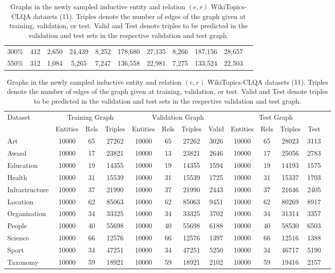 \begin{table}[!ht]
\begin{adjustbox}{width=\textwidth}
\begin{tabular}{ccccccccccc}
300\% &412  &2,650 &24,439 &8,252 &178,680 &27,135 &8,266 &187,156 &28,657 \\
550\% &312  &1,084 &5,265 &7,247 &136,558 &22,981 &7,275 &133,524 &22,503 \\
\bottomrule
\end{tabular}
\end{adjustbox}
\caption{Graphs in the newly sampled inductive entity and relation $(e,r)$ WikiTopics-CLQA datasets (11). Triples denote the number of edges of the graph given at training, validation, or test. Valid and Test denote triples to be predicted in the validation and test sets in the respective validation and test graph. 
}
\label{tab:app_datasets_indr}
\begin{adjustbox}{width=\textwidth}
\begin{tabular}{lcccccccccccc}\toprule
\multirow{2}{*}{Dataset} &\multicolumn{3}{c}{Training Graph} &\multicolumn{4}{c}{Validation Graph} &\multicolumn{4}{c}{Test Graph} \\ \cmidrule(l){2-4} \cmidrule(l){5-8} \cmidrule(l){9-12}
&Entities &Rels &Triples &Entities &Rels &Triples &Valid &Entities &Rels &Triples &Test \\\midrule
Art &10000 &65 &27262 &10000 &65 &27262 &3026 &10000 &65 &28023 &3113 \\
Award &10000 &17 &23821 &10000 &13 &23821 &2646 &10000 &17 &25056 &2783 \\
Education &10000 &19 &14355 &10000 &19 &14355 &1594 &10000 &19 &14193 &1575 \\
Health &10000 &31 &15539 &10000 &31 &15539 &1725 &10000 &31 &15337 &1703 \\
Infrastructure &10000 &37 &21990 &10000 &37 &21990 &2443 &10000 &37 &21646 &2405 \\
Location &10000 &62 &85063 &10000 &62 &85063 &9451 &10000 &62 &80269 &8917 \\
Organization &10000 &34 &33325 &10000 &34 &33325 &3702 &10000 &34 &31314 &3357 \\
People &10000 &40 &55698 &10000 &40 &55698 &6188 &10000 &40 &58530 &6503 \\
Science &10000 &66 &12576 &10000 &66 &12576 &1397 &10000 &66 &12516 &1388 \\
Sport &10000 &34 &47251 &10000 &34 &47251 &5250 &10000 &34 &46717 &5190 \\
Taxonomy &10000 &59 &18921 &10000 &59 &18921 &2102 &10000 &59 &19416 &2157 \\
\bottomrule
\end{tabular}
\end{adjustbox}
\end{table}



